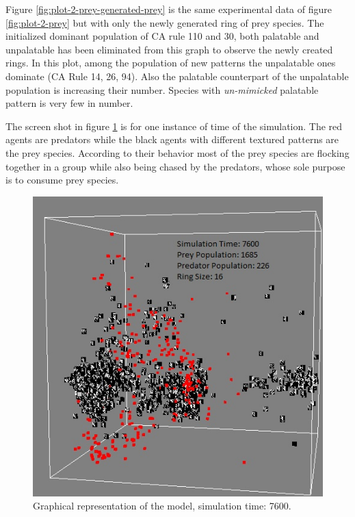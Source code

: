 Figure \ref{fig:plot-2-prey-generated-prey} is the same experimental data of figure \ref{fig:plot-2-prey} but with only the newly generated ring of prey species. The initialized dominant population of CA rule 110 and 30, both palatable and unpalatable has been eliminated from this graph to observe the newly created rings. In this plot, among the population of new patterns the unpalatable ones dominate (CA Rule 14, 26, 94). Also the palatable counterpart of the unpalatable population is increasing their number. Species with \textsl{un-mimicked} palatable pattern is very few in number.

The screen shot in figure \ref{fig:screenshot-simTime7600-2-prey} is for one instance of time of the simulation. The red agents are predators while the black agents with different textured patterns are the prey species. According to their behavior most of the prey species are flocking together in a group while also being chased by the predators, whose sole purpose is to consume prey species. 

\begin{figure}[H]
	\centering
	\label{fig:screenshot-simTime7600-2-prey}
	\includegraphics[scale=0.55]{images/simTime7600}
	\caption[Graphical representation of the model (simulation time: 7600)]{Graphical representation of the model, simulation time: 7600.}
\end{figure}

